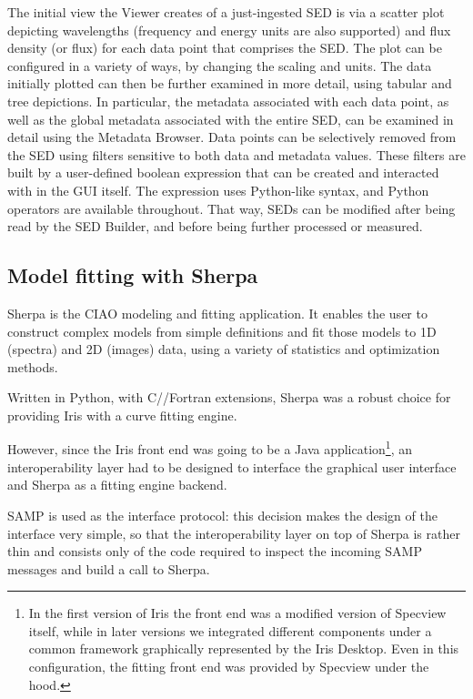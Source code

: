 \documentclass[5p]{elsarticle}
\begin{document}
The initial view the Viewer creates of a just-ingested SED is via a scatter plot depicting wavelengths (frequency and energy units are also supported) and flux density (or flux) for each data point that comprises the SED. The plot can be configured in a variety of ways, by changing the scaling and units. The data initially plotted can then be further examined in more detail, using tabular and tree depictions. In particular, the metadata associated with each data point, as well as the global metadata associated with the entire SED, can be examined in detail using the Metadata Browser. Data points can be selectively removed from the SED using filters sensitive to both data and metadata values. These filters are built by a user-defined boolean expression that can be created and interacted with in the GUI itself. The expression uses Python-like syntax, and Python operators are available throughout. That way, SEDs can be modified after being read by the SED Builder, and before being further processed or measured.

\subsection{Model fitting with Sherpa}
\label{subsec:sherpa}
Sherpa is the CIAO modeling and fitting application. It enables the user to construct complex models from simple definitions and fit those models to 1D (spectra) and 2D (images) data, using a variety of statistics and optimization methods.

Written in Python, with C/\Cpp/Fortran extensions, Sherpa was a robust choice for providing Iris with a curve fitting engine.

However, since the Iris front end was going to be a Java application\footnote{In the first version of Iris the front end was a modified version of Specview itself, while in later versions we integrated different components under a common framework graphically represented by the Iris Desktop. Even in this configuration, the fitting front end was provided by Specview under the hood.}, an interoperability layer had to be designed to interface the graphical user interface and Sherpa as a fitting engine backend.

SAMP is used as the interface protocol: this decision makes the design of the interface very simple, so that the interoperability layer on top of Sherpa is rather thin and consists only of the code required to inspect the incoming SAMP messages and build a call to Sherpa.
\end{document}

